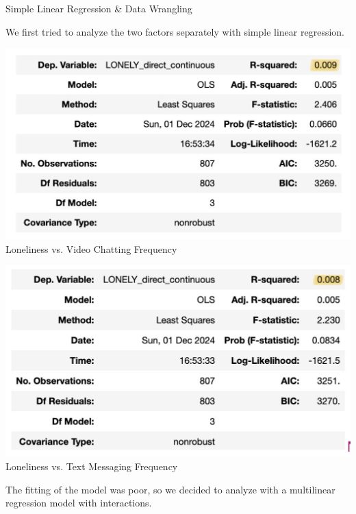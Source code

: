 \documentclass{beamer}
\begin{document}
\begin{frame}{ Simple Linear Regression \& Data Wrangling} %

\small %
We first tried to analyze the two factors separately with simple linear regression.\\

\vspace{0.5em} %

\begin{minipage}[t]{0.49\linewidth}
    \centering
    \includegraphics[width=\linewidth]{Screenshot 2024-12-01 at 12.01.04 PM.png}\\
    Loneliness vs. Video Chatting Frequency
\end{minipage}%
\hfill%
\begin{minipage}[t]{0.49\linewidth}
    \centering
    \includegraphics[width=\linewidth]{Screenshot 2024-12-01 at 12.01.09 PM.png}\\
    Loneliness vs. Text Messaging Frequency
\end{minipage}

\vspace{0.5em} %

The fitting of the model was poor, so we decided to analyze with a multilinear regression model with interactions.\\

\end{frame}
\end{document}
